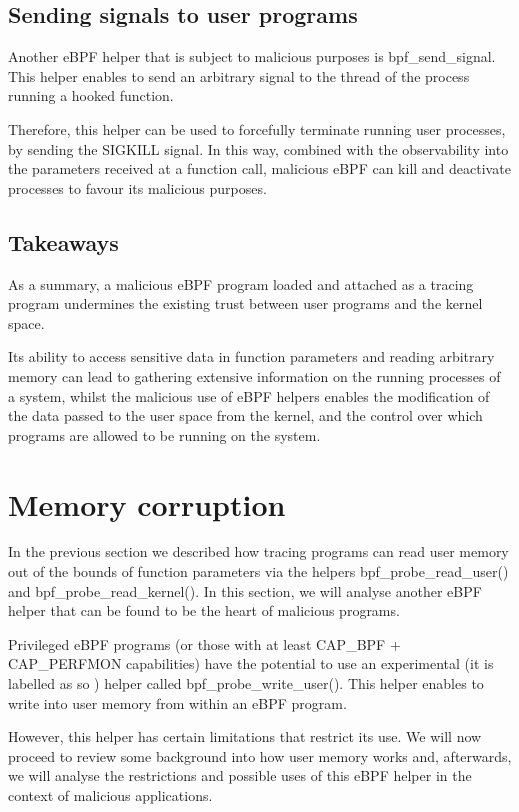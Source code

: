 \subsection{Sending signals to user programs}
Another eBPF helper that is subject to malicious purposes is bpf\_send\_signal. This helper enables to send an arbitrary signal to the thread of the process running a hooked function.

Therefore, this helper can be used to forcefully terminate running user processes, by sending the SIGKILL signal. In this way, combined with the observability into the parameters received at a function call, malicious eBPF can kill and deactivate processes to favour its malicious purposes.

\subsection{Takeaways} \label{subsection:tracing_attacks_conclusion}
As a summary, a malicious eBPF program loaded and attached as a tracing program undermines the existing trust between user programs and the kernel space. 

Its ability to access sensitive data in function parameters and reading arbitrary memory can lead to gathering extensive information on the running processes of a system, whilst the malicious use of eBPF helpers enables the modification of the data passed to the user space from the kernel, and the control over which programs are allowed to be running on the system.

\section{Memory corruption} \label{section:mem_corruption}
In the previous section we described how tracing programs can read user memory out of the bounds of function parameters via the helpers bpf\_probe\_read\_user() and bpf\_probe\_read\_kernel(). In this section, we will analyse another eBPF helper that can be found to be the heart of malicious programs.

Privileged eBPF programs (or those with at least CAP\_BPF + CAP\_PERFMON capabilities) have the potential to use an experimental (it is labelled as so \cite{ebpf_helpers}) helper called bpf\_probe\_write\_user(). This helper enables to write into user memory from within an eBPF program. 

However, this helper has certain limitations that restrict its use. We will now proceed to review some background into how user memory works and, afterwards, we will analyse the restrictions and possible uses of this eBPF helper in the context of malicious applications.


